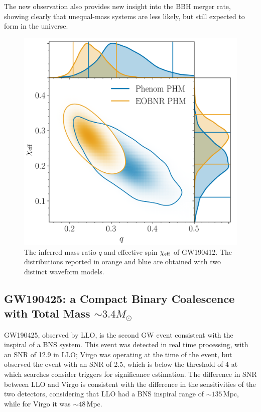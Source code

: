 \documentclass[binding=0.6cm, LaM]{sapthesis}
\begin{document}
	The new observation also provides new insight into the BBH merger rate, 
	showing clearly that unequal-mass systems are less likely, but still expected to form in the universe. \cite{133}

        \begin{figure}[!t]
          \label{asymmetric}
          \includegraphics[scale=0.2]{asymmetric}
          \centering
          \caption{The inferred mass ratio $q$ and effective spin $\chi_{\rm eff}$ of GW190412. The distributions reported in orange and blue are obtained with two distinct waveform models. \cite{133}} 
          \label{fig:asymmetric}
        \end{figure}

\subsection{GW190425: a Compact Binary Coalescence with Total Mass $\sim 3.4M_\odot$}

	GW190425, observed by LLO, is the second GW event
	consistent with the inspiral of a BNS system.
	This event was detected in real time processing, with an SNR of 12.9 in LLO; 
	Virgo was operating at the time of the event, but observed the event with an SNR of 2.5, 
	which is below the threshold of 4 at which searches consider triggers for significance estimation. 
	The difference in SNR between LLO and Virgo is consistent with the difference 
	in the sensitivities of the two detectors, considering that LLO had 
	a BNS inspiral range of $\sim 135\,$Mpc, while for Virgo it was $\sim 48\,$Mpc.
\end{document}

